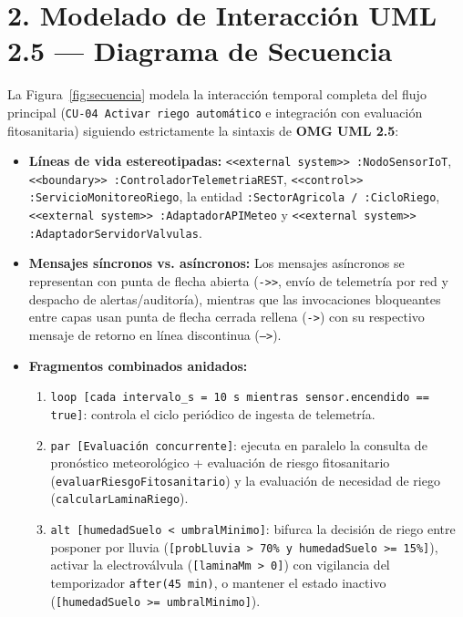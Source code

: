 \documentclass[12pt,letterpaper]{report}
\begin{document}
\section*{2. Modelado de Interacción UML 2.5 — Diagrama de Secuencia}

La Figura~\ref{fig:secuencia} modela la interacción temporal completa del flujo principal (\texttt{CU-04 Activar riego automático} e integración con evaluación fitosanitaria) siguiendo estrictamente la sintaxis de \textbf{OMG UML 2.5}:
\begin{itemize}
    \item \textbf{Líneas de vida estereotipadas:} \texttt{<<external system>> :NodoSensorIoT}, \texttt{<<boundary>> :ControladorTelemetriaREST}, \texttt{<<control>> :ServicioMonitoreoRiego}, la entidad \texttt{:SectorAgricola / :CicloRiego}, \texttt{<<external system>> :AdaptadorAPIMeteo} y \texttt{<<external system>> :AdaptadorServidorValvulas}.
    \item \textbf{Mensajes síncronos vs. asíncronos:} Los mensajes asíncronos se representan con punta de flecha abierta (\texttt{->>}, envío de telemetría por red y despacho de alertas/auditoría), mientras que las invocaciones bloqueantes entre capas usan punta de flecha cerrada rellena (\texttt{->}) con su respectivo mensaje de retorno en línea discontinua (\texttt{-->}).
    \item \textbf{Fragmentos combinados anidados:}
    \begin{enumerate}
        \item \texttt{loop [cada intervalo\_s = 10 s mientras sensor.encendido == true]}: controla el ciclo periódico de ingesta de telemetría.
        \item \texttt{par [Evaluación concurrente]}: ejecuta en paralelo la consulta de pronóstico meteorológico + evaluación de riesgo fitosanitario (\texttt{evaluarRiesgoFitosanitario}) y la evaluación de necesidad de riego (\texttt{calcularLaminaRiego}).
        \item \texttt{alt [humedadSuelo < umbralMinimo]}: bifurca la decisión de riego entre posponer por lluvia (\texttt{[probLluvia > 70\% y humedadSuelo >= 15\%]}), activar la electroválvula (\texttt{[laminaMm > 0]}) con vigilancia del temporizador \texttt{after(45 min)}, o mantener el estado inactivo (\texttt{[humedadSuelo >= umbralMinimo]}).
    \end{enumerate}
\end{itemize}
\end{document}
